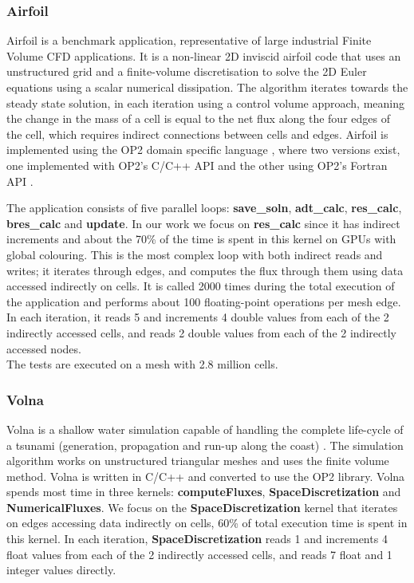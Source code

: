 \subsubsection{Airfoil}
Airfoil is a benchmark application, representative of
large industrial Finite Volume CFD applications. It is a non-linear 2D inviscid
airfoil code that uses an unstructured grid and a finite-volume discretisation
to solve the 2D Euler equations using a scalar numerical dissipation. The
algorithm iterates towards the steady state solution, in each iteration using a
control volume approach, meaning the change in the mass of a cell is equal to
the net flux along the four edges of the cell, which requires indirect
connections between cells and edges. Airfoil is implemented using the OP2 domain
specific language \cite{op2}, where two versions exist, one implemented with
OP2's C/C++ API and the other using OP2's Fortran API
\cite{giles2012op2,op2-repo}.

The application consists of five parallel loops: \textbf{save\_soln},
\textbf{adt\_calc}, \textbf{res\_calc}, \textbf{bres\_calc} and \textbf{update}.
In our work we focus on \textbf{res\_calc} since it has indirect increments and
about the 70\% of the time is spent in this kernel on GPUs with global
colouring.  This is the most complex loop with both indirect reads and writes; it
iterates through edges, and computes the flux through them using data accessed 
indirectly on cells. It is called 2000 times during the total execution of the 
application and performs about 100 floating-point operations per mesh edge. In 
each iteration, it reads 5 and increments 4 double values from each of the 2 
indirectly accessed cells, and reads 2 double values from each of the 2 
indirectly accessed nodes.
\\
 The tests are executed on a mesh with 2.8 million cells.

\subsubsection{Volna}
Volna is a shallow water simulation capable of handling the complete life-cycle
of a tsunami (generation, propagation and run-up along the coast)
\cite{dutykh2011volna}. The simulation algorithm works on unstructured
triangular meshes and uses the finite volume method. Volna is written in C/C++
and converted to use the OP2 library\cite{op2}. Volna spends most time in three 
kernels: \textbf{computeFluxes}, \textbf{SpaceDiscretization} and 
\textbf{NumericalFluxes}. We focus on the \textbf{SpaceDiscretization} kernel 
that iterates on edges accessing data indirectly on cells, 60\% of total 
execution time is spent in this kernel. In each iteration, 
\textbf{SpaceDiscretization} reads 1 and increments 4 float values from each of
the 2 indirectly accessed cells, and reads 7 float and 1 integer values directly.


